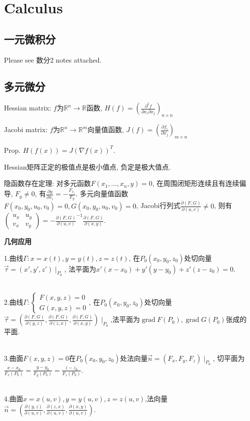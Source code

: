 \documentclass[UTF8]{ctexart}
\begin{document}
\section{Calculus}

\subsection{一元微积分}
Please see 数分2 notes attached.


\subsection{多元微分}

Hessian matrix: $f$为$\mathbb{R}^n\to\mathbb{R}$函数,
$H(f)=\left(\frac{\partial^2 f}{\partial x_i \partial x_j}\right)_{n\times n}$

Jacobi matrix: $f$为$\mathbb{R}^n\to \mathbb{R}^m$向量值函数,
$J(f)=\left(\frac{\partial f_i}{\partial x_j}\right)_{m\times n}$

Prop. $H(f(x))=J(\nabla f(x))^T$.

Hessian矩阵正定的极值点是极小值点, 负定是极大值点.

隐函数存在定理:
对多元函数$F(x_1,\dots,x_n,y)=0$, 在周围闭矩形连续且有连续偏导, $F_y\neq 0$, 有$\frac{\partial y}{\partial x_i}=-\frac{F_{x_i}}{F_y}$.
多元向量值函数$F(x_0,y_0,u_0,v_0)=0, G(x_0,y_0,u_0,v_0)=0$, Jacobi行列式$\frac{\partial(F,G)}{\partial(u,v)}\neq 0$,
则有$\begin{pmatrix} u_x & u_y \\ v_x  & v_y \end{pmatrix} = -\frac{\partial(F,G)}{\partial(u,v)} ^{-1}\frac{\partial(F,G)}{\partial(x,y)}$.


\noindent \textbf{几何应用}

\noindent 1.曲线$\Gamma: x=x(t),y=y(t),z=z(t)$,
    在$P_0(x_0,y_0,z_0)$处切向量$\vec{\tau}=(x',y',z')\mid _{P_0}$,
    法平面为$x'(x-x_0)+y'(y-y_0)+z'(z-z_0)= 0$.\par 
~\\
\noindent 2.曲线$\Gamma: \left\{\begin{array}{l}
    F(x, y, z)=0 \\ G(x, y, z)=0 \end{array}\right.$,
    在$P_0(x_0,y_0,z_0)$处切向量$\vec{\tau}=(\frac{\partial (F,G)}{\partial (y,z)},
    \frac{\partial (F,G)}{\partial (z,x)}, \frac{\partial (F,G)}{\partial (x,y)})
    \mid _{P_0}$,法平面为$\operatorname{grad}F(P_0),\operatorname{grad}G(P_0)$张成的平面.\par 
~\\
\noindent 3.曲面$F(x,y,z)=0$在$P_0(x_0,y_0,z_0)$处法向量$\vec{n}=(F_x,F_y,F_z)\mid _{P_0}$,
    切平面为$\frac{x-x_0}{F_x(P_0)}=\frac{y-y_0}{F_y(P_0)}=\frac{z-z_0}{F_z(P_0)}$.\par 
~\\
\noindent 4.曲面$x=x(u,v),y=y(u,v),z=z(u,v)$,法向量$\vec{n}=(
    \frac{\partial (y,z)}{\partial (u,v)},\frac{\partial (z,x)}{\partial (u,v)},\frac{\partial (x,y)}{\partial (u,v)})$.
\end{document}
